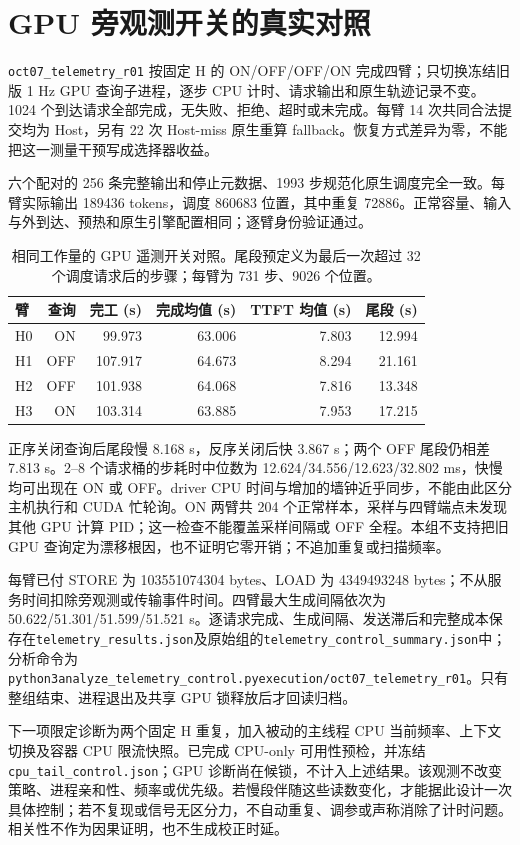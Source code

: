 \documentclass[UTF8,fontset=fandol,a4paper,10pt]{ctexart}
\newcommand{\code}[1]{\nolinkurl{#1}}
\begin{document}
\section{GPU 旁观测开关的真实对照}
\code{oct07_telemetry_r01} 按固定 H 的 ON/OFF/OFF/ON 完成四臂；只切换冻结旧版 1 Hz GPU 查询子进程，逐步 CPU 计时、请求输出和原生轨迹记录不变。1024 个到达请求全部完成，无失败、拒绝、超时或未完成。每臂 14 次共同合法提交均为 Host，另有 22 次 Host-miss 原生重算 fallback。恢复方式差异为零，不能把这一测量干预写成选择器收益。

六个配对的 256 条完整输出和停止元数据、1993 步规范化原生调度完全一致。每臂实际输出 189436 tokens，调度 860683 位置，其中重复 72886。正常容量、输入与外到达、预热和原生引擎配置相同；逐臂身份验证通过。
\begin{table}[htbp]
\centering\small
\caption{相同工作量的 GPU 遥测开关对照。尾段预定义为最后一次超过 32 个调度请求后的步骤；每臂为 731 步、9026 个位置。}
\begin{tabular}{lrrrrr}
\toprule
臂 & 查询 & 完工 (s) & 完成均值 (s) & TTFT 均值 (s) & 尾段 (s)\\
\midrule
H0 & ON  & 99.973 & 63.006 & 7.803 & 12.994\\
H1 & OFF & 107.917 & 64.673 & 8.294 & 21.161\\
H2 & OFF & 101.938 & 64.068 & 7.816 & 13.348\\
H3 & ON  & 103.314 & 63.885 & 7.953 & 17.215\\
\bottomrule
\end{tabular}
\end{table}

正序关闭查询后尾段慢 8.168 s，反序关闭后快 3.867 s；两个 OFF 尾段仍相差 7.813 s。2--8 个请求桶的步耗时中位数为 12.624/34.556/12.623/32.802 ms，快慢均可出现在 ON 或 OFF。driver CPU 时间与增加的墙钟近乎同步，不能由此区分主机执行和 CUDA 忙轮询。ON 两臂共 204 个正常样本，采样与四臂端点未发现其他 GPU 计算 PID；这一检查不能覆盖采样间隔或 OFF 全程。本组不支持把旧 GPU 查询定为漂移根因，也不证明它零开销；不追加重复或扫描频率。

每臂已付 STORE 为 103551074304 bytes、LOAD 为 4349493248 bytes；不从服务时间扣除旁观测或传输事件时间。四臂最大生成间隔依次为 50.622/51.301/51.599/51.521 s。逐请求完成、生成间隔、发送滞后和完整成本保存在\code{telemetry_results.json}及原始组的\code{telemetry_control_summary.json}中；分析命令为\texttt{python3}\enspace\code{analyze_telemetry_control.py}\enspace\code{execution/oct07_telemetry_r01}。只有整组结束、进程退出及共享 GPU 锁释放后才回读归档。

下一项限定诊断为两个固定 H 重复，加入被动的主线程 CPU 当前频率、上下文切换及容器 CPU 限流快照。已完成 CPU-only 可用性预检，并冻结\code{cpu_tail_control.json}；GPU 诊断尚在候锁，不计入上述结果。该观测不改变策略、进程亲和性、频率或优先级。若慢段伴随这些读数变化，才能据此设计一次具体控制；若不复现或信号无区分力，不自动重复、调参或声称消除了计时问题。相关性不作为因果证明，也不生成校正时延。
\end{document}
